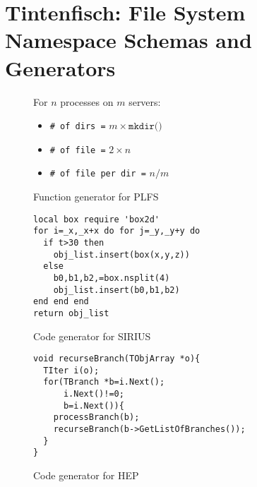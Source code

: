 \section{Tintenfisch: File System Namespace Schemas and Generators}
\label{sec:methodology}

\begin{figure}[tb]
  \centering
  For \(n\) processes on \(m\) servers:
  \begin{itemize}
    \setlength\itemsep{-0.5em}
    \item[] \texttt{\# of dirs =} \(m \times \texttt{mkdir()}\)
    \item[] \texttt{\# of file =} \(2 \times n\)
    \item[] \texttt{\# of file per dir =} \(n/m\)
  \end{itemize}
  \caption{Function generator for PLFS} \label{fig:plfs}
\end{figure}

\begin{figure}
  \ssp
  \begin{verbatim}
local box require 'box2d'
for i=_x,_x+x do for j=_y,_y+y do
  if t>30 then 
    obj_list.insert(box(x,y,z))
  else 
    b0,b1,b2,=box.nsplit(4)
    obj_list.insert(b0,b1,b2)
end end end 
return obj_list
  \end{verbatim}
  \dsp
  \caption{Code generator for SIRIUS} \label{fig:sirius}
\end{figure}
\begin{figure}
  \ssp
  \centering
  \begin{verbatim}
void recurseBranch(TObjArray *o){
  TIter i(o); 
  for(TBranch *b=i.Next();
      i.Next()!=0;
      b=i.Next()){
    processBranch(b);
    recurseBranch(b->GetListOfBranches());
  }
}
  \end{verbatim}
  \dsp
  \caption{Code generator for HEP} \label{fig:hep}
\end{figure}

 


